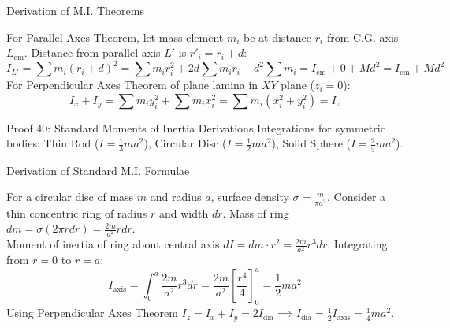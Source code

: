 \documentclass[11pt, a4paper]{report}
\begin{document}
\begin{proofbox}{Derivation of M.I. Theorems}
\begin{center}
\end{center}

For Parallel Axes Theorem, let mass element $m_i$ be at distance $r_i$ from C.G. axis $L_{\text{cm}}$. Distance from parallel axis $L'$ is $r'_i = r_i + d$:
\[
I_{L'} = \sum m_i (r_i + d)^2 = \sum m_i r_i^2 + 2d \sum m_i r_i + d^2 \sum m_i = I_{\text{cm}} + 0 + M d^2 = I_{\text{cm}} + M d^2
\]
For Perpendicular Axes Theorem of plane lamina in $XY$ plane ($z_i = 0$):
\[
I_x + I_y = \sum m_i y_i^2 + \sum m_i x_i^2 = \sum m_i (x_i^2 + y_i^2) = I_z
\]
\end{proofbox}

\begin{theorembox}{Proof 40: Standard Moments of Inertia Derivations}
Integrations for symmetric bodies: Thin Rod ($I = \frac{1}{3}ma^2$), Circular Disc ($I = \frac{1}{2}ma^2$), Solid Sphere ($I = \frac{2}{5}ma^2$).
\end{theorembox}

\begin{proofbox}{Derivation of Standard M.I. Formulae}
\begin{center}
\end{center}

For a circular disc of mass $m$ and radius $a$, surface density $\sigma = \frac{m}{\pi a^2}$. Consider a thin concentric ring of radius $r$ and width $dr$. Mass of ring $dm = \sigma (2\pi r dr) = \frac{2m}{a^2} r dr$.\\
Moment of inertia of ring about central axis $dI = dm \cdot r^2 = \frac{2m}{a^2} r^3 dr$. Integrating from $r=0$ to $r=a$:
\[
I_{\text{axis}} = \int_0^a \frac{2m}{a^2} r^3 dr = \frac{2m}{a^2} \left[ \frac{r^4}{4} \right]_0^a = \frac{1}{2} m a^2
\]
Using Perpendicular Axes Theorem $I_z = I_x + I_y = 2 I_{\text{dia}} \implies I_{\text{dia}} = \frac{1}{2} I_{\text{axis}} = \frac{1}{4} m a^2$.
\end{proofbox}
\end{document}
